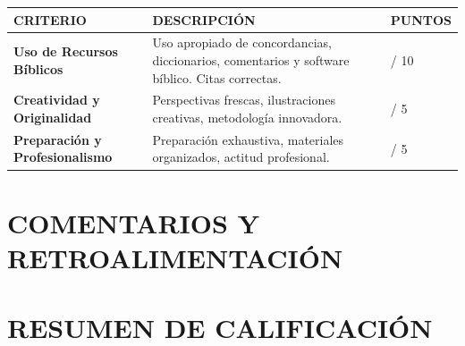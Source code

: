 \documentclass[10pt,a4paper]{article}
\newcommand{\criterio}[1]{\textbf{\textcolor{headercolor}{#1}}}
\begin{document}
\begin{center}
\begin{tabular}{|p{4.5cm}|p{6cm}|p{2cm}|}
\hline
\rowcolor{lightgray}
\criterio{CRITERIO} & \criterio{DESCRIPCIÓN} & \criterio{PUNTOS} \\
\hline
\criterio{Uso de Recursos Bíblicos} & 
Uso apropiado de concordancias, diccionarios, comentarios y software bíblico. Citas correctas. & 
\underline{\hspace{1cm}} / 10 \\
\hline
\criterio{Creatividad y Originalidad} & 
Perspectivas frescas, ilustraciones creativas, metodología innovadora. & 
\underline{\hspace{1cm}} / 5 \\
\hline
\criterio{Preparación y Profesionalismo} & 
Preparación exhaustiva, materiales organizados, actitud profesional. & 
\underline{\hspace{1cm}} / 5 \\
\hline
\end{tabular}
\end{center}

\vspace{0.5cm}
\section*{\textcolor{headercolor}{COMENTARIOS Y RETROALIMENTACIÓN}}

\begin{center}
\end{center}

\vspace{0.5cm}
\section*{\textcolor{headercolor}{RESUMEN DE CALIFICACIÓN}}
\end{document}
